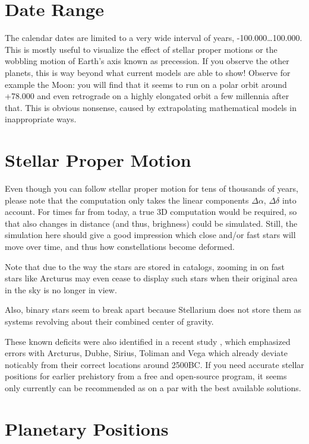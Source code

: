 \section{Date Range}
\label{sec:Accuracy:DateRange}

The calendar dates are limited to a very wide interval of years, -100.000\ldots100.000. 
This is mostly useful to visualize the effect of stellar proper motions or the wobbling 
motion of Earth's axis known as precession. 
If you observe the other planets, this is way beyond what current models are able to show! 
Observe for example the Moon: you will find that it seems to run 
on a polar orbit around +78.000 and even retrograde on a highly elongated orbit a few millennia after that. 
This is obvious nonsense, caused by extrapolating mathematical models in inappropriate ways. 

\section{Stellar Proper Motion}
\label{sec:Accuracy:ProperMotion}

Even though you can follow stellar proper motion for tens of thousands of years, 
please note that the computation only takes the linear components $\Delta\alpha$, $\Delta\delta$ into account. 
For times far from today, a true 3D computation would be required, 
so that also changes in distance (and thus, brighness) could be simulated. 
Still, the simulation here should give a good impression which close and/or fast stars 
will move over time, and thus how constellations become deformed.

Note that due to the way the stars are stored in catalogs, zooming in on fast stars like Arcturus 
may even cease to display such stars when their original area in the sky is no longer in view.

Also, binary stars seem to break apart because Stellarium does not store them as systems 
revolving about their combined center of gravity.

These known deficits were also identified in a recent study
\citep{deLorenzis:2018}, which emphasized errors with Arcturus, Dubhe,
Sirius, Toliman and Vega which already deviate noticably from their
correct locations around 2500BC.  If you need accurate stellar
positions for earlier prehistory from a free and open-source program,
it seems only  currently can be recommended as
on a par with the best available solutions.


\section{Planetary Positions}
\label{sec:Accuracy:Planets}

